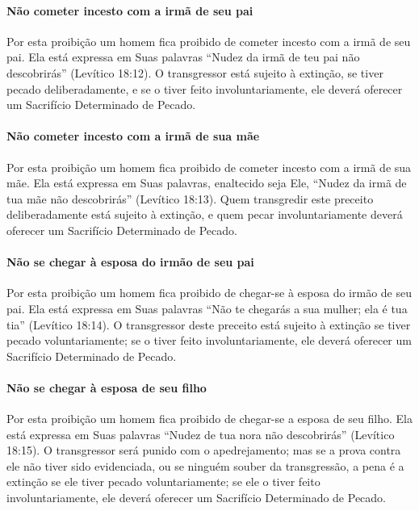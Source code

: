 \paragraph{Não cometer incesto com a irmã de seu pai}

Por esta proibição um homem fica proibido de cometer incesto com a irmã
de seu pai. Ela está expressa em Suas palavras ``Nudez da irmã de teu
pai não descobrirás'' (Levítico 18:12). O transgressor está sujeito à
extinção, se tiver pecado deliberadamente, e se o tiver feito
involuntariamente, ele deverá oferecer um Sacrifício Determinado de
Pecado.

\paragraph{Não cometer incesto com a irmã de sua mãe}

Por esta proibição um homem fica proibido de cometer incesto com a irmã
de sua mãe. Ela está expressa em Suas palavras, enaltecido seja Ele,
``Nudez da irmã de tua mãe não descobrirás'' (Levítico 18:13). Quem
transgredir este preceito deliberadamente está sujeito à extinção, e
quem pecar involuntariamente deverá oferecer um Sacrifício Determinado
de Pecado.

\paragraph{Não se chegar à esposa do irmão de seu pai}

Por esta proibição um homem fica proibido de chegar-se à esposa do irmão
de seu pai. Ela está expressa em Suas palavras ``Não te chegarás a sua
mulher; ela é tua tia'' (Levítico 18:14). O transgressor deste preceito
está sujeito à extinção se tiver pecado voluntariamente; se o tiver
feito involuntariamente, ele deverá oferecer um Sacrifício Determinado
de Pecado.

\paragraph{Não se chegar à esposa de seu filho}

Por esta proibição um homem fica proibido de chegar-se a esposa de seu
filho. Ela está expressa em Suas palavras ``Nudez de tua nora não
descobrirás'' (Levítico 18:15). O transgressor será punido com o
apedrejamento; mas se a prova contra ele não tiver sido evidenciada, ou
se ninguém souber da transgressão, a pena é a extinção se ele tiver
pecado voluntariamente; se ele o tiver feito involuntariamente, ele
deverá oferecer um Sacrifício Determinado de Pecado.

